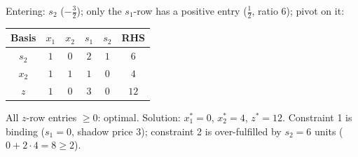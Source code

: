 \begin{solutions}
\begin{center}
\begin{tabular}{c|cccc|c}
        \end{tabular}
        \end{center}
        Entering: $s_{2}$ ($-\tfrac32$); only the $s_{1}$-row has a
        positive entry ($\tfrac12$, ratio $6$); pivot on it:
        \begin{center}
        \begin{tabular}{c|cccc|c}
        Basis & $x_{1}$ & $x_{2}$ & $s_{1}$ & $s_{2}$ & RHS\\
        \hline
        $s_{2}$ & $1$ & $0$ & $2$ & $1$ & $6$\\
        $x_{2}$ & $1$ & $1$ & $1$ & $0$ & $4$\\
        \hline
        $z$ & $1$ & $0$ & $3$ & $0$ & $12$\\
        \end{tabular}
        \end{center}
        All $z$-row entries $\ge 0$: optimal. Solution:
        $x_{1}^{*}=0$, $x_{2}^{*}=4$, $z^{*}=12$. Constraint 1 is binding
        ($s_{1}=0$, shadow price $3$); constraint 2 is over-fulfilled by
        $s_{2}=6$ units ($0+2\cdot 4=8\ge 2$).


\end{solutions}

